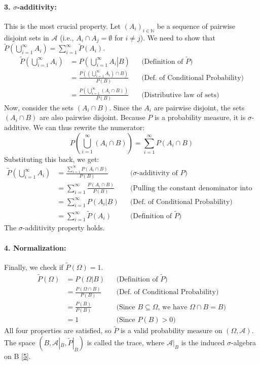 \documentclass[11pt,a4paper]{article}
\begin{document}
\paragraph{3. \(\sigma\)-additivity:}
This is the most crucial property. Let \((A_i)_{i \in \mathbb{N}}\) be a sequence of pairwise disjoint sets in \(\mathcal{A}\) (i.e., \(A_i \cap A_j = \emptyset\) for \(i \neq j\)). We need to show that \(\tilde{P}\left(\bigcup_{i=1}^\infty A_i\right) = \sum_{i=1}^\infty \tilde{P}(A_i)\).
\begin{align*}
    \tilde{P}\left(\bigcup_{i=1}^\infty A_i\right) &= P\left(\left. \bigcup_{i=1}^\infty A_i \right| B\right) && \text{(Definition of \(\tilde{P}\))} \\
    &= \frac{P\left(\left(\bigcup_{i=1}^\infty A_i\right) \cap B\right)}{P(B)} && \text{(Def. of Conditional Probability)} \\
    &= \frac{P\left(\bigcup_{i=1}^\infty (A_i \cap B)\right)}{P(B)} && \text{(Distributive law of sets)}
\end{align*}
Now, consider the sets \((A_i \cap B)\). Since the \(A_i\) are pairwise disjoint, the sets \((A_i \cap B)\) are also pairwise disjoint. Because \(P\) is a probability measure, it is \(\sigma\)-additive. We can thus rewrite the numerator:
\[ P\left(\bigcup_{i=1}^\infty (A_i \cap B)\right) = \sum_{i=1}^\infty P(A_i \cap B) \]
Substituting this back, we get:
\begin{align*}
    \tilde{P}\left(\bigcup_{i=1}^\infty A_i\right) &= \frac{\sum_{i=1}^\infty P(A_i \cap B)}{P(B)} && \text{(\(\sigma\)-additivity of \(P\))} \\
    &= \sum_{i=1}^\infty \frac{P(A_i \cap B)}{P(B)} && \text{(Pulling the constant denominator into the sum)} \\
    &= \sum_{i=1}^\infty P(A_i | B) && \text{(Def. of Conditional Probability)} \\
    &= \sum_{i=1}^\infty \tilde{P}(A_i) && \text{(Definition of \(\tilde{P}\))}
\end{align*}
The \(\sigma\)-additivity property holds.

\paragraph{4. Normalization:}
Finally, we check if \(\tilde{P}(\Omega) = 1\).
\begin{align*}
    \tilde{P}(\Omega) &= P(\Omega | B) && \text{(Definition of \(\tilde{P}\))} \\
    &= \frac{P(\Omega \cap B)}{P(B)} && \text{(Def. of Conditional Probability)} \\
    &= \frac{P(B)}{P(B)} && \text{(Since \(B \subseteq \Omega\), we have \(\Omega \cap B = B\))} \\
    &= 1 && \text{(Since \(P(B) > 0\))}
\end{align*}
All four properties are satisfied, so \(\tilde{P}\) is a valid probability measure on \((\Omega, \mathcal{A})\). The space \((B, \mathcal{A}|_B, \tilde{P}|_B)\) is called the trace, where \(\mathcal{A}|_B\) is the induced \(\sigma\)-algebra on B \hyperlink{note5}{[5]}.
\end{document}
